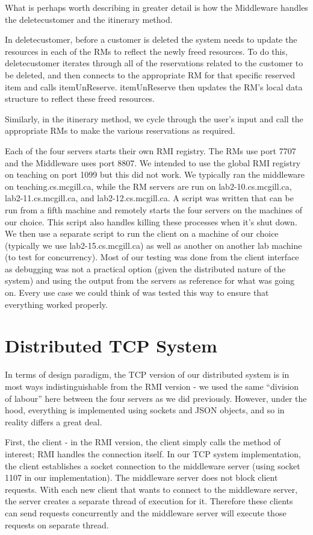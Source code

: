 \documentclass[11pt]{amsart}
\begin{document}
What is perhaps worth describing in greater detail is how the Middleware handles the deletecustomer
and the itinerary method. 

In deletecustomer, before a customer is deleted the system needs to
update the resources in each of the RMs to reflect the newly freed resources. To do this,
deletecustomer iterates through all of the reservations related to the customer to be deleted, and
then connects to the appropriate RM for that specific reserved item and calls itemUnReserve.
itemUnReserve then updates the RM's local data structure to reflect these freed resources.

Similarly, in the itinerary method, we cycle through the user's input and call the appropriate RMs
to make the various reservations as required.

Each of the four servers starts their own RMI registry. The RMs use port 7707 and the Middleware
uses port 8807. We intended to use the global RMI registry on teaching on port 1099 but this did not
work. We typically ran the middleware on teaching.cs.mcgill.ca, while the RM servers are run on
lab2-10.cs.mcgill.ca, lab2-11.cs.mcgill.ca, and lab2-12.cs.mcgill.ca. A script was written that can
be run from a fifth machine and remotely starts the four servers on the machines of our choice. This
script also handles killing these processes when it's shut down. We then use a separate script to
run the client on a machine of our choice (typically we use lab2-15.cs.mcgill.ca) as well as another
on another lab machine (to test for concurrency). Most of our testing was done from the client
interface as debugging was not a practical option (given the distributed nature of the system) and
using the output from the servers as reference for what was going on. Every use case we could think
of was tested this way to ensure that everything worked properly.

\newpage
\section{Distributed TCP System}

In terms of design paradigm, the TCP version of our distributed system is in most ways
indistinguishable from the RMI version - we used the same ``division of labour'' here between the
four servers as we did previously. However, under the hood, everything is implemented using sockets
and JSON objects, and so in reality differs a great deal. 

First, the client - in the RMI version, the client simply calls the method of interest; RMI handles
the connection itself. In our TCP system implementation, the client establishes a socket connection
to the middleware server (using socket 1107 in our implementation). The middleware server does not
block client requests. With each new client that wants to connect to the middleware server, the
server creates a separate thread of execution for it. Therefore these clients can send requests
concurrently and the middleware server will execute those requests on separate thread. 
\end{document}
